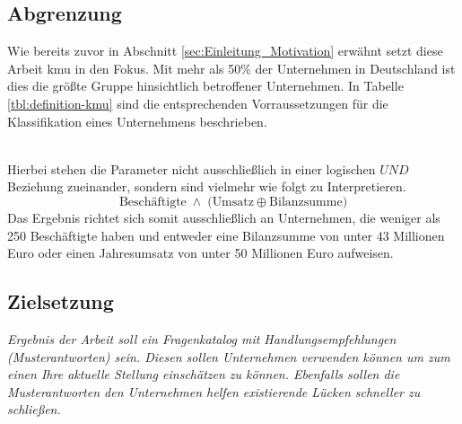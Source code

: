\documentclass[11pt,a4paper]{article}   %
\begin{document}
    \subsection{Abgrenzung}
        Wie bereits zuvor in Abschnitt \ref{sec:Einleitung_Motivation} erwähnt setzt diese Arbeit \gls{kmu} in den Fokus. Mit mehr als 50\% der Unternehmen in Deutschland ist dies die größte Gruppe hinsichtlich betroffener Unternehmen. In Tabelle \ref{tbl:definition-kmu} sind die entsprechenden Vorraussetzungen für die Klassifikation eines Unternehmens beschrieben. 
        \begin{table}[ht]
            \caption[Definition von kleinen und mittleren Unternehmen]{Definition von kleinen und mittleren Unternehmen\footnotemark}
            \label{tbl:definition-kmu}
        \end{table} \\
        Hierbei stehen die Parameter nicht ausschließlich in einer logischen \(UND\) Beziehung zueinander, sondern sind vielmehr wie folgt zu Interpretieren.
            \[
            \text{Besch\"aftigte} \;\land\;
            \bigl( \text{Umsatz} \oplus \text{Bilanzsumme} \bigr)
            \]
        Das Ergebnis richtet sich somit ausschließlich an Unternehmen, die weniger als 250 Beschäftigte haben und entweder eine Bilanzsumme von unter 43 Millionen Euro oder einen Jahresumsatz von unter 50 Millionen Euro aufweisen.
    \subsection{Zielsetzung}
        \emph{Ergebnis der Arbeit soll ein Fragenkatalog mit Handlungsempfehlungen (Musterantworten) sein. Diesen sollen Unternehmen verwenden können um zum einen Ihre aktuelle Stellung einschätzen zu können. Ebenfalls sollen die Musterantworten den Unternehmen helfen existierende Lücken schneller zu schließen.}
\end{document}
